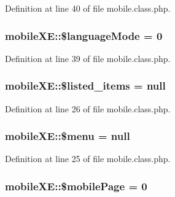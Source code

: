 Definition at line 40 of file mobile.\+class.\+php.

\subsubsection[{\texorpdfstring{\$language\+Mode}{$languageMode}}]{\setlength{\rightskip}{0pt plus 5cm}mobile\+X\+E\+::\$language\+Mode = 0}\hypertarget{classmobileXE_a70ee01279ea1bcdd609905e80e4544b7}{}\label{classmobileXE_a70ee01279ea1bcdd609905e80e4544b7}


Definition at line 39 of file mobile.\+class.\+php.

\subsubsection[{\texorpdfstring{\$listed\+\_\+items}{$listed_items}}]{\setlength{\rightskip}{0pt plus 5cm}mobile\+X\+E\+::\$listed\+\_\+items = {\bf null}}\hypertarget{classmobileXE_abd07e5909154b43a31e2ebff5d51e4c7}{}\label{classmobileXE_abd07e5909154b43a31e2ebff5d51e4c7}


Definition at line 26 of file mobile.\+class.\+php.

\subsubsection[{\texorpdfstring{\$menu}{$menu}}]{\setlength{\rightskip}{0pt plus 5cm}mobile\+X\+E\+::\$menu = {\bf null}}\hypertarget{classmobileXE_a0ebb4296d28c9cb49fabb4d1252c1434}{}\label{classmobileXE_a0ebb4296d28c9cb49fabb4d1252c1434}


Definition at line 25 of file mobile.\+class.\+php.

\subsubsection[{\texorpdfstring{\$mobile\+Page}{$mobilePage}}]{\setlength{\rightskip}{0pt plus 5cm}mobile\+X\+E\+::\$mobile\+Page = 0}\hypertarget{classmobileXE_a4017307825d19d450c677b25b70eab5e}{}\label{classmobileXE_a4017307825d19d450c677b25b70eab5e}


